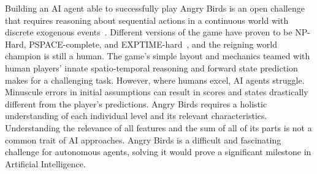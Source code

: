 







Building an AI agent able to successfully play Angry Birds is an open challenge that requires reasoning about sequential actions in a continuous world with discrete exogenous events~\cite{renz2019ai}. 
Different versions of the game have proven to be NP-Hard, PSPACE-complete, and EXPTIME-hard~\cite{stephenson2020computational}, and the reigning world champion is still a human. 
The game's simple layout and mechanics teamed with human players' innate spatio-temporal reasoning and forward state prediction makes for a challenging task. However, where humans excel, AI agents struggle. 
Minuscule errors in initial assumptions can result in scores and states drastically different from the player's predictions. Angry Birds requires a holistic understanding of each individual level and its relevant characteristics. Understanding the relevance of all features and the sum of all of its parts is not a common trait of AI approaches. Angry Birds is a difficult and fascinating challenge for autonomous agents, solving it would prove a significant milestone in Artificial Intelligence. 




